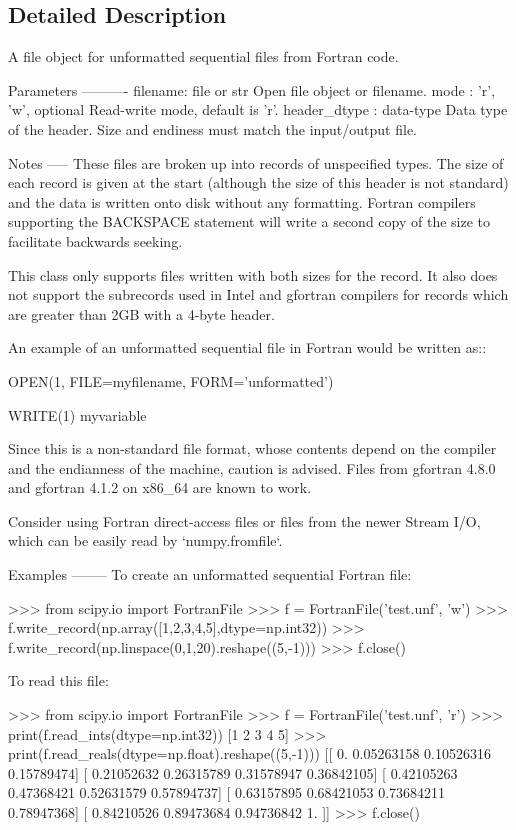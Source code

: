 \subsection{Detailed Description}
\begin{DoxyVerb}A file object for unformatted sequential files from Fortran code.

Parameters
----------
filename: file or str
    Open file object or filename.
mode : {'r', 'w'}, optional
    Read-write mode, default is 'r'.
header_dtype : data-type
    Data type of the header. Size and endiness must match the input/output file.

Notes
-----
These files are broken up into records of unspecified types. The size of
each record is given at the start (although the size of this header is not
standard) and the data is written onto disk without any formatting. Fortran
compilers supporting the BACKSPACE statement will write a second copy of
the size to facilitate backwards seeking.

This class only supports files written with both sizes for the record.
It also does not support the subrecords used in Intel and gfortran compilers
for records which are greater than 2GB with a 4-byte header.

An example of an unformatted sequential file in Fortran would be written as::

    OPEN(1, FILE=myfilename, FORM='unformatted')

    WRITE(1) myvariable

Since this is a non-standard file format, whose contents depend on the
compiler and the endianness of the machine, caution is advised. Files from
gfortran 4.8.0 and gfortran 4.1.2 on x86_64 are known to work.

Consider using Fortran direct-access files or files from the newer Stream
I/O, which can be easily read by `numpy.fromfile`.

Examples
--------
To create an unformatted sequential Fortran file:

>>> from scipy.io import FortranFile
>>> f = FortranFile('test.unf', 'w')
>>> f.write_record(np.array([1,2,3,4,5],dtype=np.int32))
>>> f.write_record(np.linspace(0,1,20).reshape((5,-1)))
>>> f.close()

To read this file:

>>> from scipy.io import FortranFile
>>> f = FortranFile('test.unf', 'r')
>>> print(f.read_ints(dtype=np.int32))
[1 2 3 4 5]
>>> print(f.read_reals(dtype=np.float).reshape((5,-1)))
[[ 0.          0.05263158  0.10526316  0.15789474]
 [ 0.21052632  0.26315789  0.31578947  0.36842105]
 [ 0.42105263  0.47368421  0.52631579  0.57894737]
 [ 0.63157895  0.68421053  0.73684211  0.78947368]
 [ 0.84210526  0.89473684  0.94736842  1.        ]]
>>> f.close()\end{DoxyVerb}
 


